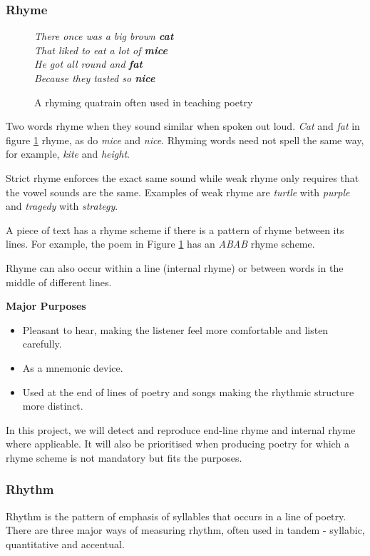 \subsubsection{Rhyme}
\begin{figure}[h!]
\centering
\textit{
There once was a big brown \textbf{cat}\\
That liked to eat a lot of \textbf{mice}\\
He got all round and \textbf{fat}\\
Because they tasted so \textbf{nice}
}
\caption{A rhyming quatrain often used in teaching poetry}
\label{fig:rhyme}
\end{figure}
Two words rhyme when they sound similar when spoken out loud. \textit{Cat} and \textit{fat} in figure \ref{fig:rhyme} rhyme, as do \textit{mice} and \textit{nice}. Rhyming words need not spell the same way, for example, \textit{kite} and \textit{height}. 

Strict rhyme enforces the exact same sound while weak rhyme only requires that the vowel sounds are the same. Examples of weak rhyme are \textit{turtle} with \textit{purple} and \textit{tragedy} with \textit{strategy}. 

A piece of text has a rhyme scheme if there is a pattern of rhyme between its lines. For example, the poem in Figure \ref{fig:rhyme} has an \textit{ABAB} rhyme scheme.

Rhyme can also occur within a line (internal rhyme) or between words in the middle of different lines.

\textbf{Major Purposes} 
\begin{itemize}
\item{Pleasant to hear, making the listener feel more comfortable and listen carefully.} 
\item{As a mnemonic device.}
\item{Used at the end of lines of poetry and songs making the rhythmic structure more distinct.}
\end{itemize}

In this project, we will detect and reproduce end-line rhyme and internal rhyme where applicable. It will also be prioritised when producing poetry for which a rhyme scheme is not mandatory but fits the purposes.

\subsubsection{Rhythm}
Rhythm is the pattern of emphasis of syllables that occurs in a line of poetry. There are three major ways of measuring rhythm, often used in tandem - syllabic, quantitative and accentual.

